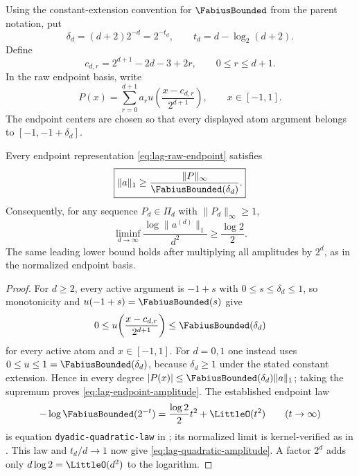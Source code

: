Using the constant-extension convention for $\FabiusBounded$ from the parent notation, put
\[
 \delta_d=(d+2)2^{-d}=2^{-t_d},
 \qquad t_d=d-\log_2(d+2).
\]
Define
\[
 c_{d,r}=2^{d+1}-2d-3+2r,\qquad 0\le r\le d+1.
\]
In the raw endpoint basis, write
\begin{equation}
 P(x)=\sum_{r=0}^{d+1}a_r
 u\!\left(\frac{x-c_{d,r}}{2^{d+1}}\right),
 \qquad x\in[-1,1].
 \label{eq:lag-raw-endpoint}
\end{equation}
The endpoint centers are chosen so that every displayed atom argument belongs
to $[-1,-1+\delta_d]$.

\begin{theorem}
\label{thm:lag-endpoint-amplitude}
Every endpoint representation \eqref{eq:lag-raw-endpoint} satisfies
\begin{equation}
 \boxed{\|a\|_1\ge
 \frac{\|P\|_\infty}{\FabiusBounded(\delta_d)}.}
 \label{eq:lag-endpoint-amplitude}
\end{equation}
Consequently, for any sequence $P_d\in\Pi_d$ with
$\|P_d\|_\infty\ge1$,
\begin{equation}
 \boxed{\liminf_{d\to\infty}
 \frac{\log\|a^{(d)}\|_1}{d^2}\ge\frac{\log2}{2}.}
 \label{eq:lag-quadratic-amplitude}
\end{equation}
The same leading lower bound holds after multiplying all amplitudes by
$2^d$, as in the normalized endpoint basis.
\end{theorem}

\begin{proof}
For $d\ge2$, every active argument is $-1+s$ with
$0\le s\le\delta_d\le1$, so monotonicity and $u(-1+s)=\FabiusBounded(s)$ give
\[
 0\le
 u\!\left(\frac{x-c_{d,r}}{2^{d+1}}\right)
 \le \FabiusBounded(\delta_d)
\]
for every active atom and $x\in[-1,1]$.  For $d=0,1$ one instead uses
$0\le u\le1=\FabiusBounded(\delta_d)$, because $\delta_d\ge1$ under the stated constant
extension.  Hence in every degree
$|P(x)|\le \FabiusBounded(\delta_d)\|a\|_1$; taking the supremum proves
\eqref{eq:lag-endpoint-amplitude}.  The established endpoint law
\[
 -\log \FabiusBounded(2^{-t})=\frac{\log2}{2}t^2+\LittleO(t^2)
 \qquad(t\to\infty)
\]
is equation \texttt{dyadic-quadratic-law} in
; its normalized limit is
kernel-verified as  in
.  This law
and $t_d/d\to1$ now give \eqref{eq:lag-quadratic-amplitude}.  A factor $2^d$
adds only $d\log2=\LittleO(d^2)$ to the logarithm.
\end{proof}

